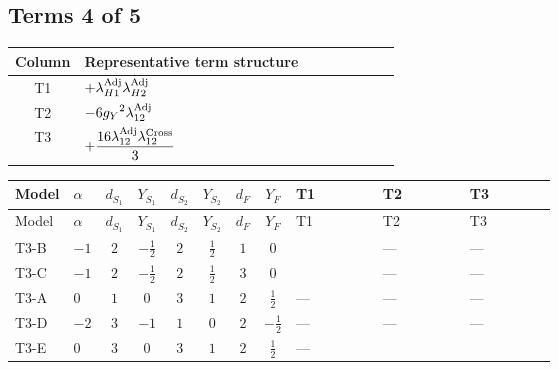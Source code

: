 \documentclass[8pt]{article}
\begin{document}
\begin{landscape}
\subsection*{Terms 4 of 5}
\begin{center}
\begin{tabular}{@{}c >{\raggedright\arraybackslash}p{0.82\linewidth}@{}}
\toprule
Column & Representative term structure \\
\midrule
T1 & \(\displaystyle +{\lambda_{H1}^{\rm Adj}} {\lambda_{H2}^{\rm Adj}}\) \\
\midrule
T2 & \(\displaystyle -6 {g_Y}^2 {\lambda_{12}^{\rm Adj}}\) \\
\midrule
T3 & \(\displaystyle +\frac{16 {\lambda_{12}^{\rm Adj}} {\lambda_{12}^{\rm Cross}}}{3}\) \\
\midrule
\bottomrule
\end{tabular}
\end{center}
\smallskip
\tiny
\begin{longtable}{@{}llcccccc >{\raggedright\arraybackslash}p{0.21\linewidth} >{\raggedright\arraybackslash}p{0.21\linewidth} >{\raggedright\arraybackslash}p{0.21\linewidth}@{}}
\toprule
Model & $\alpha$ & $d_{S_1}$ & $Y_{S_1}$ & $d_{S_2}$ & $Y_{S_2}$ & $d_F$ & $Y_F$ & T1 & T2 & T3 \\
\midrule
\endfirsthead
\toprule
Model & $\alpha$ & $d_{S_1}$ & $Y_{S_1}$ & $d_{S_2}$ & $Y_{S_2}$ & $d_F$ & $Y_F$ & T1 & T2 & T3 \\
\midrule
\endhead
T3-B & $-1$ & $2$ & $-\frac{1}{2}$ & $2$ & $\frac{1}{2}$ & $1$ & $0$ & \scriptsize\adjustbox{max width=\linewidth}{$\begin{gathered} +{\lambda_{H1}^{\rm Adj}} {\lambda_{H2}^{\rm Adj}}\end{gathered}$} & --- & --- \\
\midrule
T3-C & $-1$ & $2$ & $-\frac{1}{2}$ & $2$ & $\frac{1}{2}$ & $3$ & $0$ & \scriptsize\adjustbox{max width=\linewidth}{$\begin{gathered} +{\lambda_{H1}^{\rm Adj}} {\lambda_{H2}^{\rm Adj}}\end{gathered}$} & --- & --- \\
\midrule
T3-A & $0$ & $1$ & $0$ & $3$ & $1$ & $2$ & $\frac{1}{2}$ & --- & --- & --- \\
\midrule
T3-D & $-2$ & $3$ & $-1$ & $1$ & $0$ & $2$ & $-\frac{1}{2}$ & --- & --- & --- \\
\midrule
T3-E & $0$ & $3$ & $0$ & $3$ & $1$ & $2$ & $\frac{1}{2}$ & --- & \scriptsize\adjustbox{max width=\linewidth}{$\begin{gathered} -6 {g_Y}^2 {\lambda_{12}^{\rm Adj}}\end{gathered}$} & \scriptsize\adjustbox{max width=\linewidth}{$\begin{gathered} +\frac{16 {\lambda_{12}^{\rm Adj}} {\lambda_{12}^{\rm Cross}}}{3}\end{gathered}$} \\
\midrule
\bottomrule
\end{longtable}
\clearpage

\end{landscape}
\end{document}
